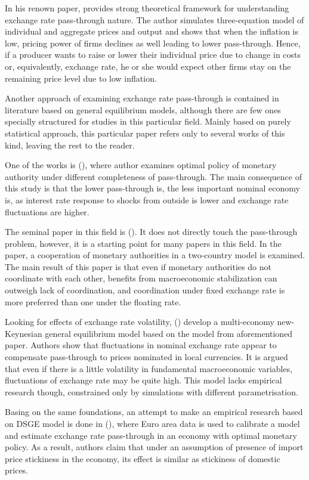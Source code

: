 \documentclass[12pt, a4paper]{extarticle}
\begin{document}
In his renown paper, \textcite{Taylor2000} provides strong theoretical framework for understanding exchange rate pass-through nature. The author simulates three-equation model of individual and aggregate prices and output and shows that when the inflation is low, pricing power of firms declines as well leading to lower pass-through. Hence, if a producer wants to raise or lower their individual price due to change in costs or, equivalently, exchange rate, he or she would expect other firms stay on the remaining price level due to low inflation.
 
Another approach of examining exchange rate pass-through is contained in literature based on general equilibrium models, although there are few ones specially structured for studies in this particular field. Mainly based on purely statistical approach, this particular paper refers only to several works of this kind, leaving the rest to the reader.

One of the works is (\cite{Adolfson2001}), where author examines optimal policy of monetary authority under different completeness of pass-through. The main consequence of this study is that the lower pass-through is, the less important nominal economy is, as interest rate response to shocks from outside is lower and exchange rate fluctuations are higher.

The seminal paper in this field is (\cite{Obstfeld2002}). It does not directly touch the pass-through problem, however, it is a starting point for many papers in this field. In the paper, a cooperation of monetary authorities in a two-country model is examined. The main result of this paper is that even if monetary authorities do not coordinate with each other, benefits from macroeconomic stabilization can outweigh lack of coordination, and coordination under fixed exchange rate is more preferred than one under the floating rate.

Looking for effects of exchange rate volatility, (\cite{Devereux2002}) develop a multi-economy new-Keynesian general equilibrium model based on the model from aforementioned paper. Authors show that fluctuations in nominal exchange rate appear to compensate pass-through to prices nominated in local currencies. It is argued that even if there is a little volatility in fundamental macroeconomic variables, fluctuations of exchange rate may be quite high. This model lacks empirical research though, constrained only by simulations with different parametrisation.

Basing on the same foundations, an attempt to make an empirical research based on DSGE model is done in (\cite{Smets2002}), where Euro area data is used to calibrate a model and estimate exchange rate pass-through in an economy with optimal monetary policy. As a result, authors claim that under an assumption of presence of import price stickiness in the economy, its effect is similar as stickiness of domestic prices.
\end{document}
